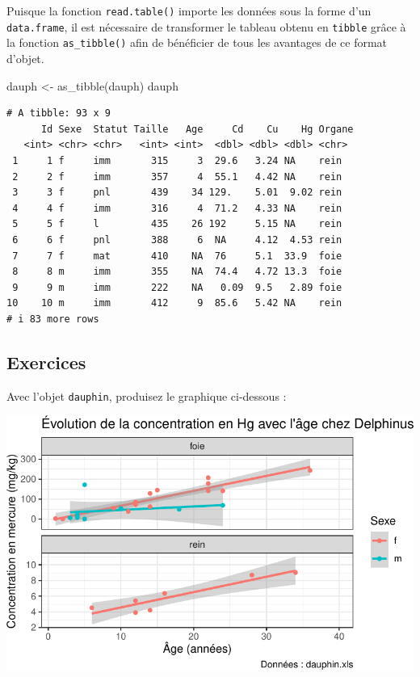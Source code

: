 \documentclass[
  a4paper,
  DIV=11,
  numbers=noendperiod,
  oneside]{scrreprt}
\newenvironment{Shaded}{}{}
\newcommand{\FunctionTok}[1]{\textcolor[rgb]{0.44,0.26,0.76}{#1}}
\newcommand{\NormalTok}[1]{\textcolor[rgb]{0.14,0.16,0.18}{#1}}
\newcommand{\OtherTok}[1]{\textcolor[rgb]{0.44,0.26,0.76}{#1}}
\begin{document}
Puisque la fonction \texttt{read.table()} importe les données sous la
forme d'un \texttt{data.frame}, il est nécessaire de transformer le
tableau obtenu en \texttt{tibble} grâce à la fonction
\texttt{as\_tibble()} afin de bénéficier de tous les avantages de ce
format d'objet.

\begin{Shaded}
\begin{Highlighting}[]
\NormalTok{dauph }\OtherTok{\textless{}{-}} \FunctionTok{as\_tibble}\NormalTok{(dauph)}
\NormalTok{dauph}
\end{Highlighting}
\end{Shaded}

\begin{verbatim}
# A tibble: 93 x 9
      Id Sexe  Statut Taille   Age     Cd    Cu    Hg Organe
   <int> <chr> <chr>   <int> <int>  <dbl> <dbl> <dbl> <chr> 
 1     1 f     imm       315     3  29.6   3.24 NA    rein  
 2     2 f     imm       357     4  55.1   4.42 NA    rein  
 3     3 f     pnl       439    34 129.    5.01  9.02 rein  
 4     4 f     imm       316     4  71.2   4.33 NA    rein  
 5     5 f     l         435    26 192     5.15 NA    rein  
 6     6 f     pnl       388     6  NA     4.12  4.53 rein  
 7     7 f     mat       410    NA  76     5.1  33.9  foie  
 8     8 m     imm       355    NA  74.4   4.72 13.3  foie  
 9     9 m     imm       222    NA   0.09  9.5   2.89 foie  
10    10 m     imm       412     9  85.6   5.42 NA    rein  
# i 83 more rows
\end{verbatim}

\subsection{Exercices}\label{sec-exo-10}

Avec l'objet \texttt{dauphin}, produisez le graphique ci-dessous :

\includegraphics{04-DataWrangling_files/figure-pdf/unnamed-chunk-11-1.pdf}
\end{document}

